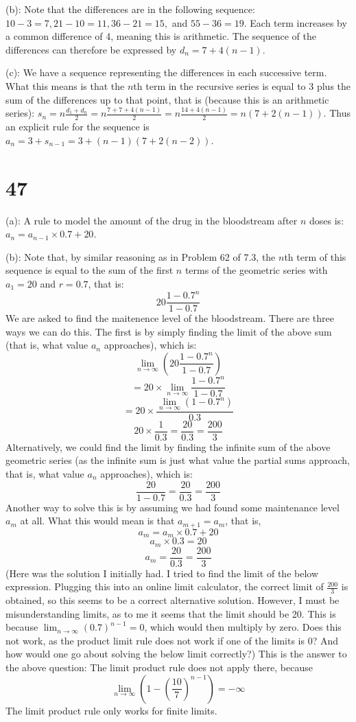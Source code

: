 \documentclass{article}
\theoremstyle{definition}
\newcommand{\?}{\stackrel{?}{=}}
\begin{document}
(b): Note that the differences are in the following sequence: $10-3=7,21-10=11,36-21=15,$ and $55-36=19$. Each term increases by a common difference of 4, meaning this is arithmetic. 
The sequence of the differences can therefore be expressed by $d_n=7+4(n-1)$.


(c): We have a sequence representing the differences in each successive term. What this means is that the $n$th term in the recursive series is equal to $3$ plus 
the sum of the differences up to that 
point, that is (because this is an arithmetic series): $s_n=n\frac{d_1+d_n}{2}=n\frac{7+7+4(n-1)}{2}=n\frac{14+4(n-1)}{2}=n(7+2(n-1))$. 
Thus an explicit rule for the sequence is $a_n=3+s_{n-1}=3+(n-1)(7+2(n-2))$.

\section*{47}
(a): A rule to model the amount of the drug in the bloodstream after $n$ doses is: $a_n=a_{n-1}\times 0.7+20$.


(b): Note that, by similar reasoning as in Problem 62 of 7.3, the $n$th term of this sequence is equal to 
the sum of the first $n$ terms of the geometric series with $a_1=20$ and $r=0.7$, that is: \[ 20\dfrac{1-0.7^n}{1-0.7} \]
We are asked to find the maitenence level of the bloodstream. There are three ways we can do this. The first is by simply finding the limit of the above sum 
(that is, what value $a_n$ approaches), which is:
\[ \lim_{n\rightarrow\infty}\left(20\dfrac{1-0.7^n}{1-0.7}\right) \]
\[ =20\times\lim_{n\rightarrow\infty}\dfrac{1-0.7^n}{1-0.7} \]
\[ =20\times\dfrac{\lim_{n\rightarrow\infty}(1-0.7^n)}{0.3} \]
\[ 20\times\frac{1}{0.3}=\frac{20}{0.3}=\frac{200}{3} \]
Alternatively, we could find the limit by finding the infinite sum of the above geometric series (as the infinite sum is just what value the partial sums approach, that 
is, what value $a_n$ approaches), which is:
\[ \frac{20}{1-0.7}=\frac{20}{0.3}=\frac{200}{3} \]
Another way to solve this is by assuming we had found some maintenance level $a_m$ at all. What this would mean is that $a_{m+1}=a_m$, that is, 
\[ a_m=a_m\times 0.7+20 \] \[ a_m\times 0.3=20 \] \[ a_m=\frac{20}{0.3}=\frac{200}{3} \]
(Here was the solution I initially had. I tried to find the limit of the below expression. Plugging this into an online limit calculator, the correct limit of 
$\frac{200}{3}$ is obtained, so this seems to be a correct alternative solution. However, I must be misunderstanding limits, as to me it seems that the limit should be 20. 
This is because $\lim_{n\rightarrow\infty}(0.7)^{n-1}=0$, which would then multiply by zero. Does this not work, as the product limit rule does not work if 
one of the limits is $0$? And how would one go about solving the below limit correctly?)\newline
This is the answer to the above question: The limit product rule does not apply there, because \[ \lim_{n\rightarrow\infty}(1-(\frac{10}{7})^{n-1})=-\infty \] The limit 
product rule only works for finite limits.
\end{document}
